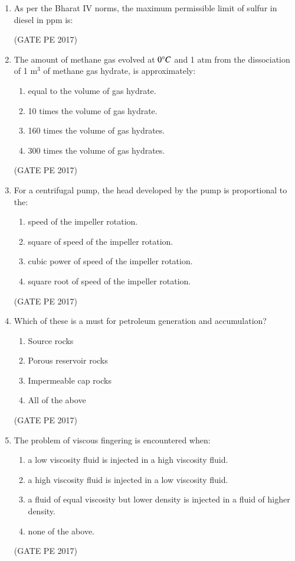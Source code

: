 \documentclass[journal,12pt,onecolumn]{IEEEtran}
\theoremstyle{remark}
\begin{document}
\begin{enumerate}
\item As per the Bharat IV norms, the maximum permissible limit of sulfur in diesel in ppm is:
\begin{enumerate}
\end{enumerate}
\hfill{(GATE PE 2017)}

\item The amount of methane gas evolved at $0\degree C$ and 1 atm from the dissociation of 1 m$^3$ of methane gas hydrate, is approximately:
\begin{enumerate}
\item equal to the volume of gas hydrate.
\item 10 times the volume of gas hydrate.
\item 160 times the volume of gas hydrates.
\item 300 times the volume of gas hydrates.
\end{enumerate}
\hfill{(GATE PE 2017)}

\item For a centrifugal pump, the head developed by the pump is proportional to the:
\begin{enumerate}
\item speed of the impeller rotation.
\item square of speed of the impeller rotation.
\item cubic power of speed of the impeller rotation.
\item square root of speed of the impeller rotation.
\end{enumerate}
\hfill{(GATE PE 2017)}

\item Which of these is a must for petroleum generation and accumulation?
\begin{enumerate}
\item Source rocks
\item Porous reservoir rocks
\item Impermeable cap rocks
\item All of the above
\end{enumerate}
\hfill{(GATE PE 2017)}

\item The problem of viscous fingering is encountered when:
\begin{enumerate}
\item a low viscosity fluid is injected in a high viscosity fluid.
\item a high viscosity fluid is injected in a low viscosity fluid.
\item a fluid of equal viscosity but lower density is injected in a fluid of higher density.
\item none of the above.
\end{enumerate}
\hfill{(GATE PE 2017)}


\end{enumerate}
\end{document}
